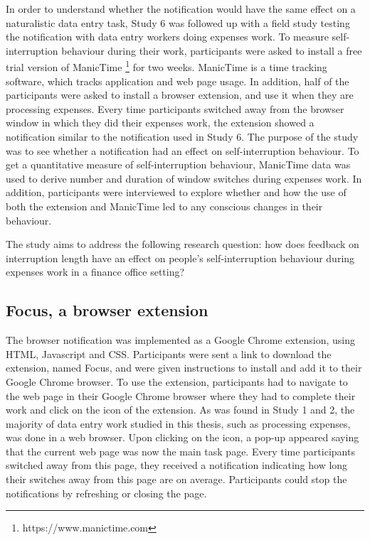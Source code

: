 In order to understand whether the notification would have the same effect on a naturalistic data entry task, Study 6 was followed up with a field study testing the notification with data entry workers doing expenses work. To measure self-interruption behaviour during their work, participants were asked to install a free trial version of ManicTime \footnote{https://www.manictime.com} for two weeks. ManicTime is a time tracking software, which tracks application and web page usage. In addition, half of the participants were asked to install a browser extension, and use it when they are processing expenses. Every time participants switched away from the browser window in which they did their expenses work, the extension showed a notification similar to the notification used in Study 6. The purpose of the study was to see whether a notification had an effect on self-interruption behaviour. To get a quantitative measure of self-interruption behaviour, ManicTime data was used to derive number and duration of window switches during expenses work. In addition, participants were interviewed to explore whether and how the use of both the extension and ManicTime led to any conscious changes in their behaviour.
 
The study aims to address the following research question: how does feedback on interruption length have an effect on people's self-interruption behaviour during expenses work in a finance office setting? 

\subsection{Focus, a browser extension}
The browser notification was implemented as a Google Chrome extension, using HTML, Javascript and CSS. Participants were sent a link to download the extension, named Focus, and were given instructions to install and add it to their Google Chrome browser. To use the extension, participants had to navigate to the web page in their Google Chrome browser where they had to complete their work and click on the icon of the extension. As was found in Study 1 and 2, the majority of data entry work studied in this thesis, such as processing expenses, was done in a web browser. Upon clicking on the icon, a pop-up appeared saying that the current web page was now the main task page. Every time participants switched away from this page, they received a notification indicating how long their switches away from this page are on average. Participants could stop the notifications by refreshing or closing the page. 

